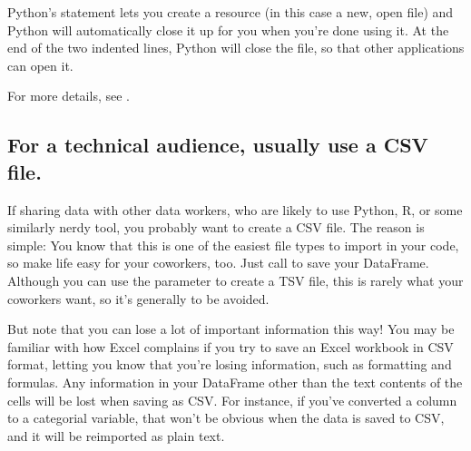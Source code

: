 \documentclass[letterpaper,10pt,english]{jupyterBook}
\begin{document}
\begin{sphinxVerbatim}[commandchars=\\\{\}]
             
         
           
\end{sphinxVerbatim}

\sphinxAtStartPar
Python’s  statement lets you create a resource (in this case a new, open file) and Python will automatically close it up for you when you’re done using it.  At the end of the two indented lines, Python will close the file, so that other applications can open it.

\sphinxAtStartPar
For more details, see .


\subsection{For a technical audience, usually use a CSV file.}
\label{\detokenize{chapter-13-etl:for-a-technical-audience-usually-use-a-csv-file}}
\sphinxAtStartPar
If sharing data with other data workers, who are likely to use Python, R, or some similarly nerdy tool, you probably want to create a CSV file.  The reason is simple: You know that this is one of the easiest file types to import in your code, so make life easy for your coworkers, too.  Just call  to save your DataFrame.  Although you can use the  parameter to create a TSV file, this is rarely what your coworkers want, so it’s generally to be avoided.

\sphinxAtStartPar
But note that you can lose a lot of important information this way!  You may be familiar with how Excel complains if you try to save an Excel workbook in CSV format, letting you know that you’re losing information, such as formatting and formulas.  Any information in your DataFrame other than the text contents of the cells will be lost when saving as CSV.  For instance, if you’ve converted a column to a categorial variable, that won’t be obvious when the data is saved to CSV, and it will be re\sphinxhyphen{}imported as plain text.
\end{document}
